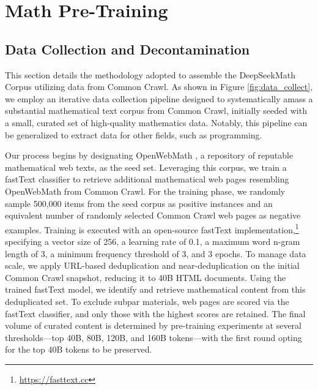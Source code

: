 \section{Math Pre-Training}

\subsection{Data Collection and Decontamination} This section details the methodology adopted to assemble the DeepSeekMath Corpus utilizing data from Common Crawl. As shown in Figure \ref{fig:data_collect}, we employ an iterative data collection pipeline designed to systematically amass a substantial mathematical text corpus from Common Crawl, initially seeded with a small, curated set of high-quality mathematics data. Notably, this pipeline can be generalized to extract data for other fields, such as programming.

Our process begins by designating OpenWebMath \citep{openwebmath}, a repository of reputable mathematical web texts, as the seed set. Leveraging this corpus, we train a fastText classifier \citep{joulin2016fasttext} to retrieve additional mathematical web pages resembling OpenWebMath from Common Crawl. For the training phase, we randomly sample 500,000 items from the seed corpus as positive instances and an equivalent number of randomly selected Common Crawl web pages as negative examples. Training is executed with an open-source fastText implementation,\footnote{\url{https://fasttext.cc}} specifying a vector size of 256, a learning rate of 0.1, a maximum word n-gram length of 3, a minimum frequency threshold of 3, and 3 epochs. To manage data scale, we apply URL-based deduplication and near-deduplication on the initial Common Crawl snapshot, reducing it to 40B HTML documents. Using the trained fastText model, we identify and retrieve mathematical content from this deduplicated set. To exclude subpar materials, web pages are scored via the fastText classifier, and only those with the highest scores are retained. The final volume of curated content is determined by pre-training experiments at several thresholds—top 40B, 80B, 120B, and 160B tokens—with the first round opting for the top 40B tokens to be preserved.

